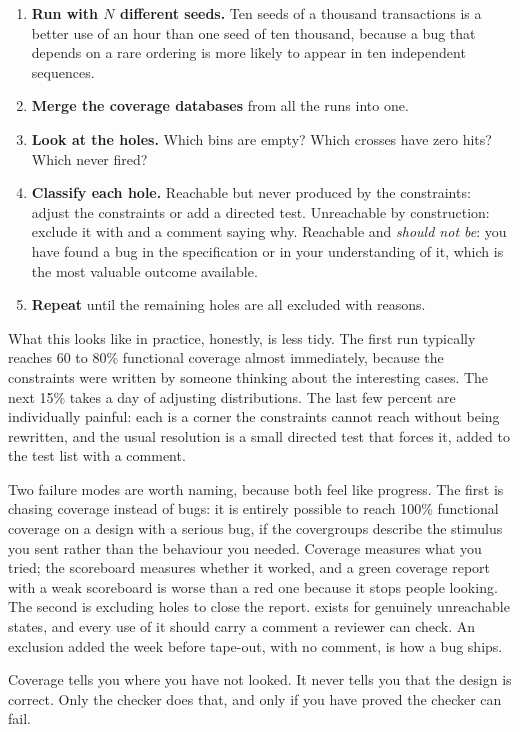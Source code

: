 \begin{enumerate}
\item \textbf{Run with $N$ different seeds.} Ten seeds of a thousand
  transactions is a better use of an hour than one seed of ten thousand,
  because a bug that depends on a rare ordering is more likely to appear in ten
  independent sequences.
\item \textbf{Merge the coverage databases} from all the runs into one.
\item \textbf{Look at the holes.} Which bins are empty? Which crosses have zero
  hits? Which  never fired?
\item \textbf{Classify each hole.} Reachable but never produced by the
  constraints: adjust the constraints or add a directed test. Unreachable by
  construction: exclude it with  and a comment saying why.
  Reachable and \emph{should not be}: you have found a bug in the
  specification or in your understanding of it, which is the most valuable
  outcome available.
\item \textbf{Repeat} until the remaining holes are all excluded with reasons.
\end{enumerate}

What this looks like in practice, honestly, is less tidy. The first run
typically reaches 60 to 80\% functional coverage almost immediately, because
the constraints were written by someone thinking about the interesting cases.
The next 15\% takes a day of adjusting distributions. The last few percent are
individually painful: each is a corner the constraints cannot reach without
being rewritten, and the usual resolution is a small directed test that forces
it, added to the test list with a comment.

Two failure modes are worth naming, because both feel like progress. The first
is chasing coverage instead of bugs: it is entirely possible to reach 100\%
functional coverage on a design with a serious bug, if the covergroups describe
the stimulus you sent rather than the behaviour you needed. Coverage measures
what you tried; the scoreboard measures whether it worked, and a green coverage
report with a weak scoreboard is worse than a red one because it stops people
looking. The second is excluding holes to close the report.
 exists for genuinely unreachable states, and every use of
it should carry a comment a reviewer can check. An exclusion added the week
before tape-out, with no comment, is how a bug ships.

\begin{ruleofthumb}
Coverage tells you where you have not looked. It never tells you that the
design is correct. Only the checker does that, and only if you have proved the
checker can fail.
\end{ruleofthumb}


